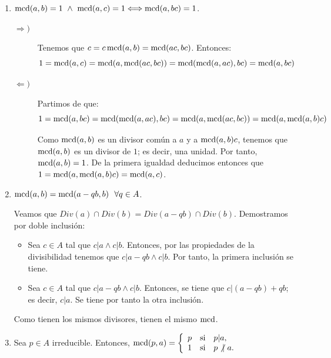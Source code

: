 \begin{enumerate}
    Como $b|c$, $\exists x\in A \mid c=bx$. Como $a|bx$ y $\mcd(a,b)$, por la propiedad anterior tenemos que $a|x$, es decir, $\exists y\in A\mid x=ay$. Por tanto, tenemos que $c=aby$, por lo que $ab|c$.

    \item $\operatorname{mcd}(a,b)=1 \ \land \  \operatorname{mcd}(a,c)=1 \Longleftrightarrow \operatorname{mcd}(a,bc)=1$.
    \begin{description}
        \item[$\Longrightarrow)$] Tenemos que $c=c\operatorname{mcd}(a,b)=\operatorname{mcd}(ac,bc)$. Entonces:
        \begin{equation*}
            1=\operatorname{mcd}(a,c)=\operatorname{mcd}(a,\operatorname{mcd}(ac,bc)) = \operatorname{mcd}(\operatorname{mcd}(a,ac), bc) = \operatorname{mcd}(a,bc)
        \end{equation*}

        \item[$\Longleftarrow)$] Partimos de que:
        \begin{equation*}
            1=\operatorname{mcd}(a,bc) = \operatorname{mcd}(\operatorname{mcd}(a,ac), bc) = \operatorname{mcd}(a,\operatorname{mcd}(ac,bc)) = \operatorname{mcd}(a,\operatorname{mcd}(a,b)c)
        \end{equation*}

        Como $\mcd(a,b)$ es  un divisor común a $a$ y a $\operatorname{mcd}(a,b)c$, tenemos que $\mcd(a,b)$ es un divisor de $1$; es decir, una unidad. Por tanto, $\operatorname{mcd}(a,b)=1$. De la primera igualdad deducimos entonces que $1=\operatorname{mcd}(a,\operatorname{mcd}(a,b)c) = \operatorname{mcd}(a,c)$.
    \end{description}

    \item $\operatorname{mcd}(a,b)=\operatorname{mcd}(a-qb, b)~~\forall q \in A$.

    Veamos que $Div(a)\cap Div(b)=Div(a-qb)\cap Div(b)$. Demostramos por doble inclusión:
    \begin{itemize}
        \item Sea $c\in A$ tal que $c|a\land c|b$. Entonces, por las propiedades de la divisibilidad tenemos que $c|a-qb\land c|b$. Por tanto, la primera inclusión se tiene.

        \item Sea $c\in A$ tal que $c|a-qb\land c|b$. Entonces, se tiene que $c|(a-qb)+qb$; es decir, $c|a$. Se tiene por tanto la otra inclusión.
    \end{itemize}
    Como tienen los mismos divisores, tienen el mismo $\operatorname{mcd}$.

    \item Sea $p\in A$ irreducible. Entonces, 
    $\operatorname{mcd}(p,a) = \left\{ \begin{array}{lll}
            p & \text{si} & p|a,      \\
            1 & \text{si} & p\not|~a.
        \end{array} \right.$


\end{enumerate}
